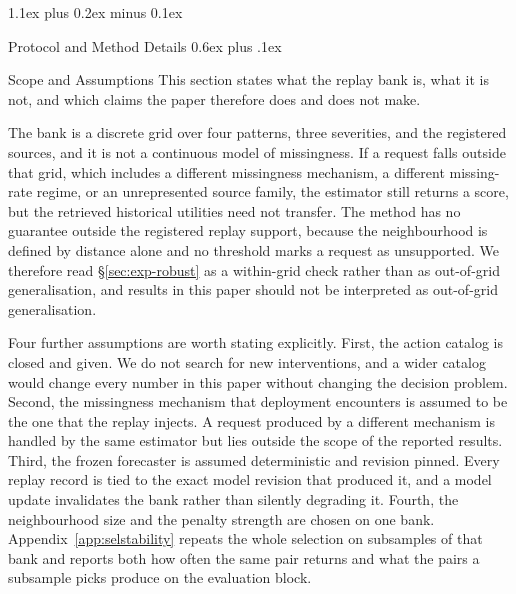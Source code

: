 \documentclass{article}
\makeatletter
\def\section{\@startsection{section}{1}{\z@}{-1.6ex plus -0.5ex minus -.2ex}%
  {1.1ex plus 0.2ex minus 0.1ex}{\large\sc\raggedright}}
\def\subsection{\@startsection{subsection}{2}{\z@}{-1.4ex plus -0.4ex minus -.2ex}%
  {0.6ex plus .1ex}{\normalsize\sc\raggedright}}
\makeatother
\begin{document}
\section{Protocol and Method Details}
\label{app:protocol}
\subsection{Scope and Assumptions}
\label{app:scope}
This section states what the replay bank is, what it is not, and which claims the paper
therefore does and does not make.

The bank is a discrete grid over four patterns, three severities, and the registered sources,
and it is not a continuous model of missingness. If a request falls outside that grid, which
includes a different missingness mechanism, a different missing-rate regime, or an
unrepresented source family, the estimator still returns a score, but the retrieved
historical utilities need not transfer. The method has no guarantee outside the registered
replay support, because the neighbourhood is defined by distance alone and no threshold marks
a request as unsupported. We therefore read \S\ref{sec:exp-robust} as a within-grid check
rather than as out-of-grid generalisation, and results in this paper should not be interpreted
as out-of-grid generalisation.

Four further assumptions are worth stating explicitly. First, the action catalog is closed and
given. We do not search for new interventions, and a wider catalog would change every number
in this paper without changing the decision problem. Second, the missingness mechanism that
deployment encounters is assumed to be the one that the replay injects. A request produced by
a different mechanism is handled by the same estimator but lies outside the scope of the
reported results. Third, the frozen forecaster is assumed deterministic and revision pinned.
Every replay record is tied to the exact model revision that produced it, and a model update
invalidates the bank rather than silently degrading it. Fourth, the neighbourhood size and the
penalty strength are chosen on one bank. Appendix~\ref{app:selstability} repeats the whole
selection on subsamples of that bank and reports both how often the same pair returns and what
the pairs a subsample picks produce on the evaluation block.
\end{document}
